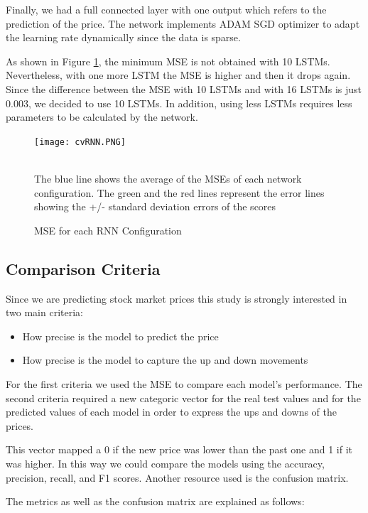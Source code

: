 Finally, we had a full connected layer with one output which refers to the prediction of the price. The network implements ADAM SGD optimizer to adapt the learning rate dynamically since the data is sparse. 

As shown in Figure \ref{fig:cvRNN}, the minimum MSE is not obtained with 10 LSTMs. Nevertheless, with one more LSTM the MSE is higher and then it drops again. Since the difference between the MSE with 10 LSTMs and with 16 LSTMs is just 0.003, we decided to use 10 LSTMs. In addition, using less LSTMs requires less parameters to be calculated by the network.  

\begin{figure}[h]
\centering
\texttt{[image: cvRNN.PNG]}
\caption{MSE for each RNN Configuration}
\begin{minipage}{12cm}
    \footnotesize
    \emph \\ The blue line shows the average of the MSEs of each network configuration. The green and the red lines represent the error lines showing the +/- standard deviation errors of the scores
    \end{minipage}
\label{fig:cvRNN}
\end{figure}

\subsection{Comparison Criteria}

Since we are predicting stock market prices this study is strongly interested in two main criteria:

\begin{itemize}
\item How precise is the model to predict the price
\item How precise is the model to capture the up and down movements
\end{itemize}

For the first criteria we used the MSE to compare each model's performance. The second criteria required a new categoric vector for the real test values and for the predicted values of each model in order to express the ups and downs of the prices.

This vector mapped a 0 if the new price was lower than the past one and 1 if it was higher. In this way we could compare the models using the accuracy, precision, recall, and F1 scores. Another resource used is the confusion matrix. 

The metrics as well as the confusion matrix are explained as follows:

